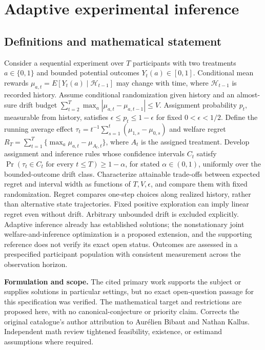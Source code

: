 \documentclass[11pt]{article}
\begin{document}
\section*{Adaptive experimental inference}\label{30007710}
\subsection{Definitions and mathematical statement}
Consider a sequential experiment over \(T\) participants with two treatments \(a\in\{0,1\}\) and bounded potential outcomes \(Y_t(a)\in[0,1]\). Conditional mean rewards \(\mu_{a,t}=E[Y_t(a)\mid\mathcal H_{t-1}]\) may change with time, where \(\mathcal H_{t-1}\) is recorded history. Assume conditional randomization given history and an almost-sure drift budget \(\sum_{t=2}^{T}\max_a|\mu_{a,t}-\mu_{a,t-1}|\leq V\). Assignment probability \(p_t\), measurable from history, satisfies \(\epsilon\leq p_t\leq1-\epsilon\) for fixed \(0<\epsilon<1/2\). Define the running average effect \(\tau_t=t^{-1}\sum_{s=1}^{t}(\mu_{1,s}-\mu_{0,s})\) and welfare regret \(R_T=\sum_{t=1}^{T}\{\max_a\mu_{a,t}-\mu_{A_t,t}\}\), where \(A_t\) is the assigned treatment. Develop assignment and inference rules whose confidence intervals \(C_t\) satisfy \(\Pr(\tau_t\in C_t\text{ for every }t\leq T)\geq1-\alpha\), for stated \(\alpha\in(0,1)\), uniformly over the bounded-outcome drift class. Characterize attainable trade-offs between expected regret and interval width as functions of \(T,V,\epsilon\), and compare them with fixed randomization. Regret compares one-step choices along realized history, rather than alternative state trajectories. Fixed positive exploration can imply linear regret even without drift. Arbitrary unbounded drift is excluded explicitly. Adaptive inference already has established solutions; the nonstationary joint welfare-and-inference optimization is a proposed extension, and the supporting reference does not verify its exact open status. Outcomes are assessed in a prespecified participant population with consistent measurement across the observation horizon.

\par\textbf{Formulation and scope.} The cited primary work supports the subject or supplies solutions in particular settings, but no exact open-question passage for this specification was verified. The mathematical target and restrictions are proposed here, with no canonical-conjecture or priority claim. Corrects the original catalogue's author attribution to Aurélien Bibaut and Nathan Kallus. Independent math review tightened feasibility, existence, or estimand assumptions where required.
\end{document}
